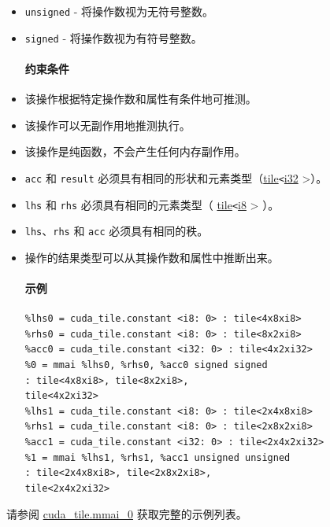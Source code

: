 \documentclass{article}
\begin{document}
\begin{itemize}
\item \texttt{unsigned} - 将操作数视为无符号整数。
\item \texttt{signed} - 将操作数视为有符号整数。


\paragraph{约束条件}

\item 该操作根据特定操作数和属性有条件地可推测。
\item 该操作可以无副作用地推测执行。
\item 该操作是纯函数，不会产生任何内存副作用。
\item \texttt{acc} 和 \texttt{result} 必须具有相同的形状和元素类型（\href{https://docs.nvidia.com/cuda/tile-ir/latest/sections/types.html#type-tile}{tile}\texttt{<}\href{https://docs.nvidia.com/cuda/tile-ir/latest/sections/types.html#subsection-element-types}{i32} >）。
\item \texttt{lhs} 和 \texttt{rhs} 必须具有相同的元素类型（ \href{https://docs.nvidia.com/cuda/tile-ir/latest/sections/types.html#type-tile}{tile}\texttt{<}\href{https://docs.nvidia.com/cuda/tile-ir/latest/sections/types.html#subsection-element-types}{i8} > ）。
\item \texttt{lhs}、\texttt{rhs} 和 \texttt{acc} 必须具有相同的秩。
\item 操作的结果类型可以从其操作数和属性中推断出来。


\paragraph{示例}

\begin{lstlisting}
%lhs0 = cuda_tile.constant <i8: 0> : tile<4x8xi8>
%rhs0 = cuda_tile.constant <i8: 0> : tile<8x2xi8>
%acc0 = cuda_tile.constant <i32: 0> : tile<4x2xi32>
%0 = mmai %lhs0, %rhs0, %acc0 signed signed
: tile<4x8xi8>, tile<8x2xi8>,
tile<4x2xi32>
%lhs1 = cuda_tile.constant <i8: 0> : tile<2x4x8xi8>
%rhs1 = cuda_tile.constant <i8: 0> : tile<2x8x2xi8>
%acc1 = cuda_tile.constant <i32: 0> : tile<2x4x2xi32>
%1 = mmai %lhs1, %rhs1, %acc1 unsigned unsigned
: tile<2x4x8xi8>, tile<2x8x2xi8>,
tile<2x4x2xi32>
\end{lstlisting}

\end{itemize}
请参阅 \href{https://docs.nvidia.com/cuda/tile-ir/latest/sections/appendix.html#example-cuda-tile-mmai-0}{cuda\_tile.mmai\_0} 获取完整的示例列表。
\end{document}
